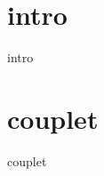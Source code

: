 
\xxxstruct

\newpage

\begin{multicols}{2}
	\xxxlyrics
\end{multicols}

\newpage
\section*{intro}
{intro}
\section*{couplet}
{couplet}
